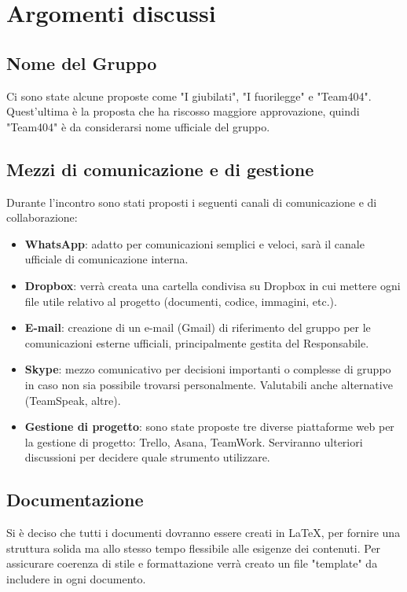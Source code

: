 \documentclass[a4paper,11pt]{article}
\begin{document}
	\newpage
	\section{Argomenti discussi}
		\subsection{Nome del Gruppo}
		Ci sono state alcune proposte come "I giubilati", "I fuorilegge" e "Team404". Quest'ultima è la proposta che ha riscosso maggiore approvazione, quindi "Team404" è da considerarsi nome ufficiale del gruppo.
		\subsection{Mezzi di comunicazione e di gestione}
		Durante l'incontro sono stati proposti i seguenti canali di comunicazione e di collaborazione:
		\begin{itemize}
			\item \textbf{WhatsApp}: adatto per comunicazioni semplici e veloci, sarà il canale ufficiale di comunicazione interna.
			\item \textbf{Dropbox}: verrà creata una cartella condivisa su Dropbox in cui mettere ogni file utile relativo al progetto (documenti, codice, immagini, etc.).
			\item \textbf{E-mail}: creazione di un e-mail (Gmail) di riferimento del gruppo per le comunicazioni esterne ufficiali, principalmente gestita del Responsabile.
			\item \textbf{Skype}: mezzo comunicativo per decisioni importanti o complesse di gruppo in caso non sia possibile trovarsi personalmente. Valutabili anche alternative (TeamSpeak, altre).
			\item \textbf{Gestione di progetto}: sono state proposte tre diverse piattaforme web per la gestione di progetto: Trello, Asana, TeamWork. Serviranno ulteriori discussioni per decidere quale strumento utilizzare.
		\end{itemize}
		\subsection{Documentazione}
		Si è deciso che tutti i documenti dovranno essere creati in LaTeX, per fornire una struttura solida ma allo stesso tempo flessibile alle esigenze dei contenuti. Per assicurare coerenza di stile e formattazione verrà creato un file "template" da includere in ogni documento.
\end{document}
